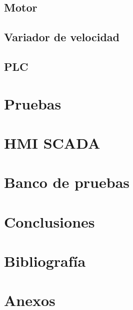 \documentclass[12pt,a4paper]{article}
\begin{document}
\subsection{Motor}


\subsection{Variador de velocidad}

	
\subsection{PLC}

	
\section{Pruebas}


\section{HMI SCADA}


\section{Banco de pruebas}





\section{Conclusiones}


\section{Bibliografía}

\section{Anexos}

\end{document}
